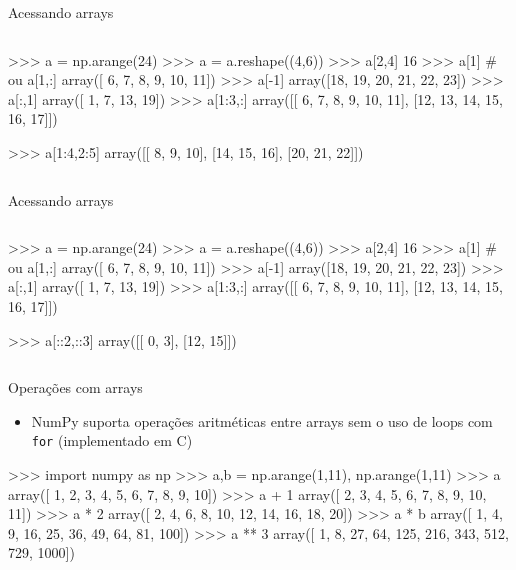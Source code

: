 \documentclass[12pt,t,graphics]{beamer}
\begin{document}
\begin{frame}[t,fragile]{Acessando arrays}
	\vspace{-0.5cm}
	\begin{columns}
		\begin{python}
>>> a = np.arange(24)
>>> a = a.reshape((4,6))
>>> a[2,4]
16
>>> a[1]  # ou a[1,:]
array([ 6,  7,  8,  9, 10, 11])
>>> a[-1]
array([18, 19, 20, 21, 22, 23])
>>> a[:,1]
array([ 1,  7, 13, 19])
>>> a[1:3,:]
array([[ 6,  7,  8,  9, 10, 11],
	[12, 13, 14, 15, 16, 17]])
		
>>> a[1:4,2:5]
array([[ 8,  9, 10],
	   [14, 15, 16],
	   [20, 21, 22]])
		\end{python}
	\end{columns}
\end{frame}

\begin{frame}[t,fragile]{Acessando arrays}
	\vspace{-0.5cm}
	\begin{columns}
		\column{.8\textwidth}
		\begin{python}
>>> a = np.arange(24)
>>> a = a.reshape((4,6))
>>> a[2,4]
16
>>> a[1]  # ou a[1,:]
array([ 6,  7,  8,  9, 10, 11])
>>> a[-1]
array([18, 19, 20, 21, 22, 23])
>>> a[:,1]
array([ 1,  7, 13, 19])
>>> a[1:3,:]
array([[ 6,  7,  8,  9, 10, 11],
[12, 13, 14, 15, 16, 17]])

>>> a[::2,::3]
array([[ 0,  3],
[12, 15]])
		\end{python}
	\end{columns}
\end{frame}

\begin{frame}[t,fragile]{Operações com arrays}
	\begin{itemize}
		\item NumPy suporta operações aritméticas entre arrays sem o uso de loops
		com \texttt{for} (implementado em C)
	\end{itemize}
	\begin{python}
>>> import numpy as np
>>> a,b = np.arange(1,11), np.arange(1,11)
>>> a
array([ 1, 2, 3, 4, 5, 6, 7, 8, 9, 10])
>>> a + 1
array([ 2, 3, 4, 5, 6, 7, 8, 9, 10, 11])
>>> a * 2
array([ 2, 4, 6, 8, 10, 12, 14, 16, 18, 20])
>>> a * b
array([ 1, 4, 9, 16, 25, 36, 49, 64, 81, 100])
>>> a ** 3
array([ 1, 8, 27, 64, 125, 216, 343, 512, 729, 1000])
	\end{python}
\end{frame}
\end{document}
